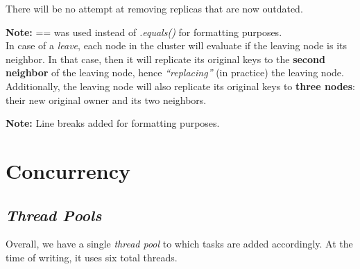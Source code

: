 \documentclass{article}
\begin{document}
\begin{multicols}{2}
    There will be no attempt at removing replicas that are now outdated.
    
    \textbf{Note:}{ == was used instead of \textit{.equals()} for formatting purposes.} \\
    
    In case of a \textit{leave}, each node in the cluster will evaluate if the leaving node is its neighbor. In that case, then it will replicate its original keys to the \textbf{second neighbor} of the leaving node, hence \textit{“replacing”} (in practice) the leaving node.
     \\
    
    Additionally, the leaving node will also replicate its original keys to \textbf{three nodes}: their new original owner and its two neighbors. 
    
    
    \textbf{Note:}{ Line breaks added for formatting purposes.}
    
    \section{Concurrency}
    
    \subsection{\textit{Thread Pools}}
    Overall, we have a single \textit{thread pool} to which tasks are added accordingly. At the time of writing, it uses six total threads. \\
    

\end{multicols}
\end{document}
